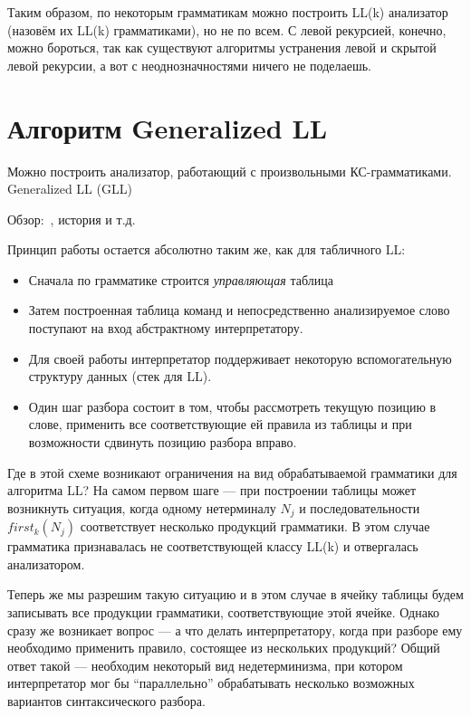 Таким образом, по некоторым грамматикам можно построить LL(k) анализатор (назовём их LL(k) грамматиками), но не по всем.
С левой рекурсией, конечно, можно бороться, так как существуют алгоритмы устранения левой и скрытой левой рекурсии, а вот с неоднозначностями ничего не поделаешь.


\section{Алгоритм Generalized LL}

Можно построить анализатор, работающий с произвольными КС-грамматиками.
Generalized LL (GLL)~\cite{Scott:2010:GP:1860132.1860320,10.1007/978-3-662-46663-6_5}

Обзор:~\cite{Cappers2014ExploringAV}, история и т.д.~\cite{Afroozeh2019PracticalGT}

Принцип работы остается абсолютно таким же, как для табличного LL:
\begin{itemize}
  \item Сначала по грамматике строится \textit{управляющая} таблица
  \item Затем построенная таблица команд и непосредственно анализируемое слово поступают на вход абстрактному интерпретатору.
  \item Для своей работы интерпретатор поддерживает некоторую вспомогательную структуру данных (стек для LL).
  \item Один шаг разбора состоит в том, чтобы рассмотреть текущую позицию в слове, применить все соответствующие ей правила из таблицы и при возможности сдвинуть позицию разбора вправо.
\end{itemize}

Где в этой схеме возникают ограничения на вид обрабатываемой грамматики для алгоритма LL? На самом первом шаге --- при построении таблицы может возникнуть ситуация, когда одному нетерминалу $N_j$ и последовательности $first_k(N_j)$ соответствует несколько продукций грамматики. В этом случае грамматика признавалась не соответствующей классу LL(k) и отвергалась анализатором.

Теперь же мы разрешим такую ситуацию и в этом случае в ячейку таблицы будем записывать все продукции грамматики, соответствующие этой ячейке. Однако сразу же возникает вопрос --- а что делать интерпретатору, когда при разборе ему необходимо применить правило, состоящее из нескольких продукций? Общий ответ такой --- необходим некоторый вид недетерминизма, при котором интерпретатор мог бы ``параллельно'' обрабатывать несколько возможных вариантов синтаксического разбора.

